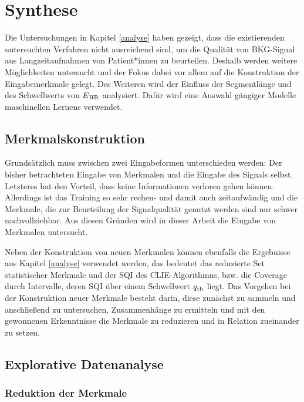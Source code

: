 \chapter{Synthese}

Die Untersuchungen in Kapitel \ref{analyse} haben gezeigt, dass die existierenden untersuchten Verfahren nicht ausreichend sind, um die Qualität von \ac{BKG}-Signal aus Langzeitaufnahmen von Patient*innen zu beurteilen. Deshalb werden weitere Möglichkeiten untersucht und der Fokus dabei vor allem auf die Konstruktion der Eingabemerkmale gelegt. Des Weiteren wird der Einfluss der Segmentlänge und des Schwellwerts von $E\textsubscript{HR}$ analysiert. Dafür wird eine Auswahl gängiger Modelle maschinellen Lernens verwendet.

\section{Merkmalskonstruktion}

Grundsätzlich muss zwischen zwei Eingabeformen unterschieden werden: Der bisher betrachteten Eingabe von Merkmalen und die Eingabe des Signals selbst. Letzteres hat den Vorteil, dass keine Informationen verloren gehen können. Allerdings ist das Training so sehr rechen- und damit auch zeitaufwändig und die Merkmale, die zur Beurteilung der Signalqualität genutzt werden sind nur schwer nachvollziehbar. Aus diesen Gründen wird in dieser Arbeit die Eingabe von Merkmalen untersucht.

Neben der Konstruktion von neuen Merkmalen können ebenfalls die Ergebnisse aus Kapitel \ref{analyse} verwendet werden, das bedeutet das reduzierte Set statistischer Merkmale und der \ac{SQI} des \ac{CLIE}-Algorithmus, bzw. die Coverage durch Intervalle, deren \ac{SQI} über einem Schwellwert $q\textsubscript{th}$ liegt. Das Vorgehen bei der Konstruktion neuer Merkmale besteht darin, diese zunächst zu sammeln und anschließend zu untersuchen, Zusammenhänge zu ermitteln und mit den gewonnenen Erkenntnisse die Merkmale zu reduzieren und in Relation zueinander zu setzen.


\section{Explorative Datenanalyse}

\subsection{Reduktion der Merkmale}

